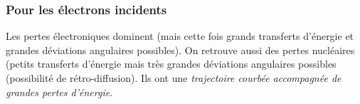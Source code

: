 \subsubsection{Pour les électrons incidents}
Les pertes électroniques dominent (mais cette fois grands transferts d'énergie et grandes déviations
angulaires possibles). On retrouve aussi des pertes nucléaires (petits transferts d'énergie mais
très grandes déviations angulaires possibles (possibilité de rétro-diffusion). Ils ont une 
\textit{trajectoire courbée accompagnée de grandes pertes d'énergie}.





